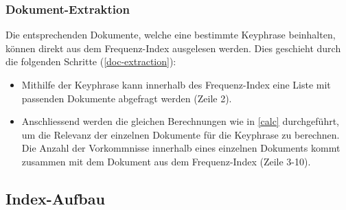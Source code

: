 \subsubsection{Dokument-Extraktion}
Die entsprechenden Dokumente, welche eine bestimmte \gls{Keyphrase} beinhalten, können direkt aus dem Frequenz-Index ausgelesen werden. Dies geschieht durch die folgenden Schritte (\autoref{doc-extraction}):
\begin{itemize}
    \item Mithilfe der \gls{Keyphrase} kann innerhalb des Frequenz-Index eine Liste mit passenden Dokumente abgefragt werden (Zeile 2).
    \item Anschliessend werden die gleichen Berechnungen wie in \autoref{calc} durchgeführt, um die Relevanz der einzelnen Dokumente für die \gls{Keyphrase} zu berechnen. Die Anzahl der Vorkommnisse innerhalb eines einzelnen Dokuments kommt zusammen mit dem Dokument aus dem Frequenz-Index (Zeile 3-10).
\end{itemize}



\subsection{Index-Aufbau}\label{indexstructure}


